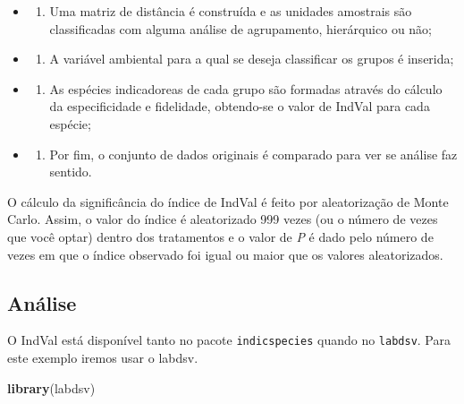 \documentclass[
]{book}
\newenvironment{Shaded}{\begin{snugshade}}{\end{snugshade}}
\newcommand{\KeywordTok}[1]{\textcolor[rgb]{0.13,0.29,0.53}{\textbf{#1}}}
\newcommand{\NormalTok}[1]{#1}
\providecommand{\tightlist}{%
  \setlength{\itemsep}{0pt}\setlength{\parskip}{0pt}}
\begin{document}
\begin{itemize}
\item
  \begin{enumerate}
  \def\labelenumi{\arabic{enumi}.}
  \tightlist
  \item
    Uma matriz de distância é construída e as unidades amostrais são classificadas com alguma análise de agrupamento, hierárquico ou não;
  \end{enumerate}
\item
  \begin{enumerate}
  \def\labelenumi{\arabic{enumi}.}
  \setcounter{enumi}{1}
  \tightlist
  \item
    A variável ambiental para a qual se deseja classificar os grupos é inserida;
  \end{enumerate}
\item
  \begin{enumerate}
  \def\labelenumi{\arabic{enumi}.}
  \setcounter{enumi}{2}
  \tightlist
  \item
    As espécies indicadoreas de cada grupo são formadas através do cálculo da especificidade e fidelidade, obtendo-se o valor de IndVal para cada espécie;
  \end{enumerate}
\item
  \begin{enumerate}
  \def\labelenumi{\arabic{enumi}.}
  \setcounter{enumi}{3}
  \tightlist
  \item
    Por fim, o conjunto de dados originais é comparado para ver se análise faz sentido.
  \end{enumerate}
\end{itemize}

O cálculo da significância do índice de IndVal é feito por aleatorização de Monte Carlo. Assim, o valor do índice é aleatorizado 999 vezes (ou o número de vezes que você optar) dentro dos tratamentos e o valor de \emph{P} é dado pelo número de vezes em que o índice observado foi igual ou maior que os valores aleatorizados.

\hypertarget{anuxe1lise-2}{%
\subsection{Análise}\label{anuxe1lise-2}}

O IndVal está disponível tanto no pacote \texttt{indicspecies} quando no \texttt{labdsv}. Para este exemplo iremos usar o labdsv.

\begin{Shaded}
\begin{Highlighting}[]
\KeywordTok{library}\NormalTok{(labdsv)}
\end{Highlighting}
\end{Shaded}
\end{document}
